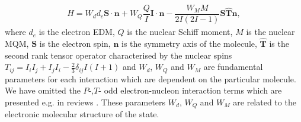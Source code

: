 \documentclass[10pt,a4paper, twoside, openright]{report}
\begin{document}
\begin{align}
H = W_d d_e \mathbf{S}\cdot\mathbf{n} + W_{Q}\dfrac{Q}{I}\mathbf{I}\cdot\mathbf{n} - \dfrac{W_{M}M}{2I(2I -1)}\mathbf{S}\hat{\mathbf{T}}\mathbf{n},
\end{align}
where $d_e$ is the electron EDM, $Q$ is the nuclear Schiff moment, $M$ is the nuclear MQM, $\mathbf{S}$ is the electron spin, $\mathbf{n}$ is the symmetry axis of the molecule, $\hat{\mathbf{T}} $ is the second rank tensor operator characterised by the nuclear spins $T_{ij} = I_iI_j + I_jI_i - \tfrac{2}{3}\delta_{ij}I(I + 1)$  and  $W_d$, $W_Q$ and $W_M$ are fundamental parameters for each interaction which are dependent on the particular molecule. We have omitted the $P$-,$T$- odd electron-nucleon interaction terms which are presented e.g. in reviews \cite{Safronova2017,GF2004}. 
These parameters $W_d$, $W_Q$ and $W_M$
are related to the electronic molecular structure of the state.
 
\end{document}
